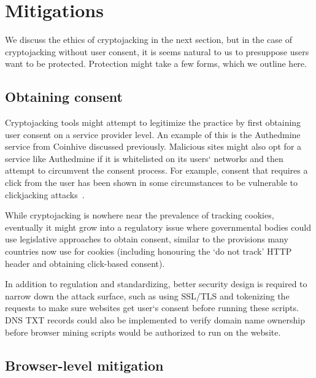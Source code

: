 
\section{Mitigations}

We discuss the ethics of cryptojacking in the next section, but in the case of cryptojacking without user consent, it is seems natural to us to presuppose users want to be protected. Protection might take a few forms, which we outline here.

\subsection{Obtaining consent}

Cryptojacking tools might attempt to legitimize the practice by first obtaining user consent on a service provider level. An example of this is the Authedmine service from Coinhive discussed previously. Malicious sites might also opt for a service like Authedmine if it is whitelisted on its users` networks and then attempt to circumvent the consent process. For example, consent that requires a click from the user has been shown in some circumstances to be vulnerable to clickjacking attacks~\cite{rydstedt2010busting}.

While cryptojacking is nowhere near the prevalence of tracking cookies, eventually it might grow into a regulatory issue where governmental bodies could use legislative approaches to obtain consent, similar to the provisions many countries now use for cookies (including honouring the `do not track' HTTP header and obtaining click-based consent).

In addition to regulation and standardizing, better security design is required to narrow down the attack surface, such as using SSL/TLS and tokenizing the requests to make sure websites get user`s consent before running these scripts. DNS TXT records could also be implemented to verify domain name ownership before browser mining scripts would be authorized to run on the website.

\subsection{Browser-level mitigation}


